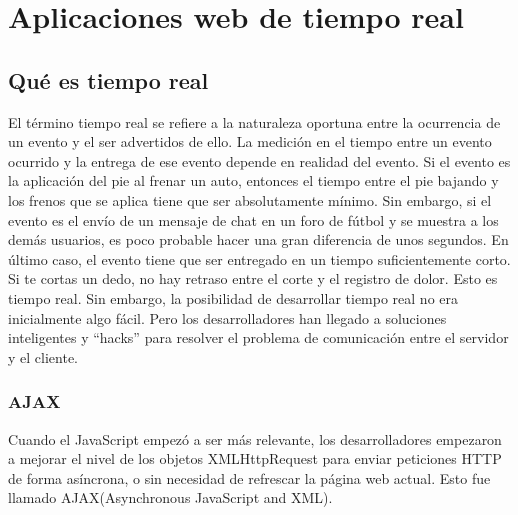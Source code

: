 \section{Aplicaciones web de tiempo real}
\subsection{Qué es tiempo real}
El término tiempo real se refiere a la naturaleza oportuna entre la ocurrencia de un evento y el ser advertidos de ello. La medición en el tiempo entre un evento ocurrido y la entrega de ese evento depende en realidad del evento. Si el evento es la aplicación del pie al frenar un auto, entonces el tiempo entre el pie bajando y los frenos que se aplica tiene que ser absolutamente mínimo. Sin embargo, si el evento es el envío de un mensaje de chat en un foro de fútbol y se muestra a los demás usuarios, es poco probable hacer una gran diferencia de unos segundos. En último caso, el evento tiene que ser entregado en un tiempo suficientemente corto. Si te cortas un dedo, no hay retraso entre el corte y el registro de dolor. Esto es tiempo real. Sin embargo, la posibilidad de desarrollar tiempo real no era inicialmente algo fácil. Pero los desarrolladores han llegado a soluciones inteligentes y ``hacks'' para resolver el problema de comunicación entre el servidor y el cliente.

\subsubsection{AJAX}
Cuando el JavaScript empezó a ser más relevante, los desarrolladores empezaron a mejorar el nivel de los objetos XMLHttpRequest para enviar peticiones HTTP de forma asíncrona, o sin necesidad de refrescar la página web actual. Esto fue llamado AJAX(Asynchronous JavaScript and XML).

